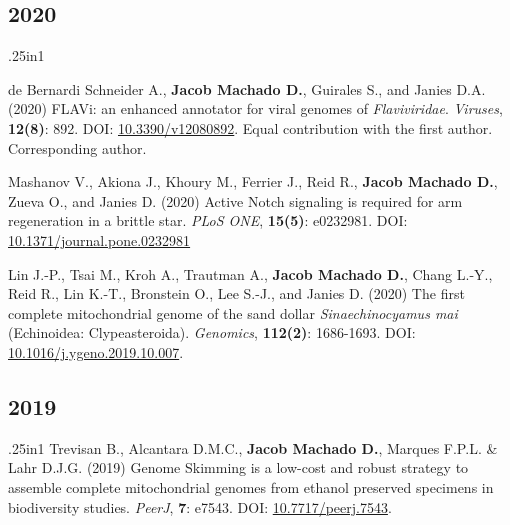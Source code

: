 \documentclass[11pt, letterpaper, sans]{moderncv}
\begin{document}

\subsection{2020}

    {\setlength{\parskip}{.5em}\renewcommand{\baselinestretch}{2.0}\begin{hangparas}{.25in}{1}

        de Bernardi Schneider A., \textbf{Jacob Machado D.}, Guirales S., and Janies D.A. (2020) FLAVi: an enhanced annotator for viral genomes of \emph{Flaviviridae}. \emph{Viruses}, \textbf{12(8)}: 892. DOI: \href{https://doi.org/10.3390/v12080892}{10.3390/v12080892}. Equal contribution with the first author. Corresponding author.

	    Mashanov V., Akiona J., Khoury M., Ferrier J., Reid R., \textbf{Jacob Machado D.}, Zueva O., and Janies D. (2020) Active Notch signaling is required for arm regeneration in a brittle star. \emph{PLoS ONE}, \textbf{15(5)}: e0232981. DOI: \href{https://doi.org/10.1371/journal.pone.0232981}{10.1371/journal.pone.0232981}

	    Lin J.-P., Tsai M., Kroh A., Trautman A., \textbf{Jacob Machado D.}, Chang L.-Y., Reid R., Lin K.-T., Bronstein O., Lee S.-J., and Janies D. (2020) The first complete mitochondrial genome of the sand dollar \emph{Sinaechinocyamus mai} (Echinoidea: Clypeasteroida). \emph{Genomics}, \textbf{112(2)}: 1686-1693. DOI: \href{https://doi.org/10.1016/j.ygeno.2019.10.007}{10.1016/j.ygeno.2019.10.007}.

	\end{hangparas}}


\subsection{2019}

    {\setlength{\parskip}{.5em}\renewcommand{\baselinestretch}{2.0}\begin{hangparas}{.25in}{1}
		Trevisan B., Alcantara D.M.C., \textbf{Jacob Machado D.}, Marques F.P.L. \& Lahr D.J.G. (2019) Genome Skimming is a low-cost and robust strategy to assemble complete mitochondrial genomes from ethanol preserved specimens in biodiversity studies. \emph{PeerJ}, \textbf{7}: e7543. DOI: \href{https://doi.org/10.7717/peerj.7543}{10.7717/peerj.7543}.
	\end{hangparas}}
\end{document}
